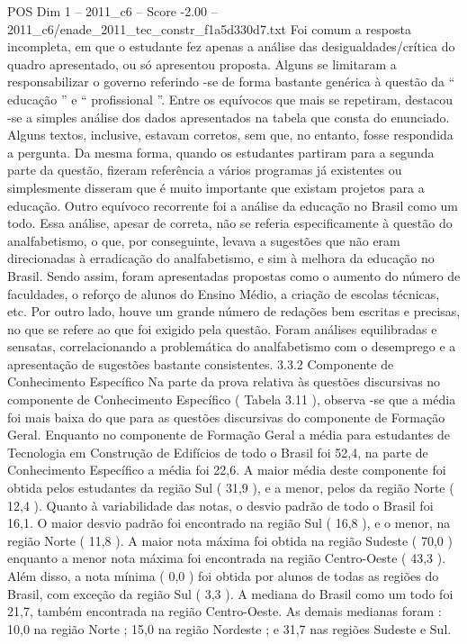 \begin{textsample}{POS Dim 1 – 2011\_c6 – Score -2.00 – 2011\_c6/enade\_2011\_tec\_constr\_f1a5d330d7.txt}
Foi comum a resposta incompleta, em que o estudante fez apenas a análise das desigualdades/crítica do quadro apresentado, ou só apresentou proposta.
Alguns se limitaram a responsabilizar o governo referindo -se de forma bastante genérica à questão da “ educação ” e “ profissional ”.
Entre os equívocos que mais se repetiram, destacou -se a simples análise dos dados apresentados na tabela que consta do enunciado.
Alguns textos, inclusive, estavam corretos, sem que, no entanto, fosse respondida a pergunta.
Da mesma forma, quando os estudantes partiram para a segunda parte da questão, fizeram referência a vários programas já existentes ou simplesmente disseram que é muito importante que existam projetos para a educação.
Outro equívoco recorrente foi a análise da educação no Brasil como um todo.
Essa análise, apesar de correta, não se referia especificamente à questão do analfabetismo, o que, por conseguinte, levava a sugestões que não eram direcionadas à erradicação do analfabetismo, e sim à melhora da educação no Brasil.
Sendo assim, foram apresentadas propostas como o aumento do número de faculdades, o reforço de alunos do Ensino Médio, a criação de escolas técnicas, etc.
Por outro lado, houve um grande número de redações bem escritas e precisas, no que se refere ao que foi exigido pela questão.
Foram análises equilibradas e sensatas, correlacionando a problemática do analfabetismo com o desemprego e a apresentação de sugestões bastante consistentes. 3.3.2 Componente de Conhecimento Específico Na parte da prova relativa às questões discursivas no componente de Conhecimento Específico ( Tabela 3.11 ), observa -se que a média foi mais baixa do que para as questões discursivas do componente de Formação Geral.
Enquanto no componente de Formação Geral a média para estudantes de Tecnologia em Construção de Edifícios de todo o Brasil foi 52,4, na parte de Conhecimento Específico a média foi 22,6.
A maior média deste componente foi obtida pelos estudantes da região Sul ( 31,9 ), e a menor, pelos da região Norte ( 12,4 ).
Quanto à variabilidade das notas, o desvio padrão de todo o Brasil foi 16,1.
O maior desvio padrão foi encontrado na região Sul ( 16,8 ), e o menor, na região Norte ( 11,8 ).
A maior nota máxima foi obtida na região Sudeste ( 70,0 ) enquanto a menor nota máxima foi encontrada na região Centro-Oeste ( 43,3 ).
Além disso, a nota mínima ( 0,0 ) foi obtida por alunos de todas as regiões do Brasil, com exceção da região Sul ( 3,3 ).
A mediana do Brasil como um todo foi 21,7, também encontrada na região Centro-Oeste.
As demais medianas foram : 10,0 na região Norte ; 15,0 na região Nordeste ; e 31,7 nas regiões Sudeste e Sul.

\end{textsample}
